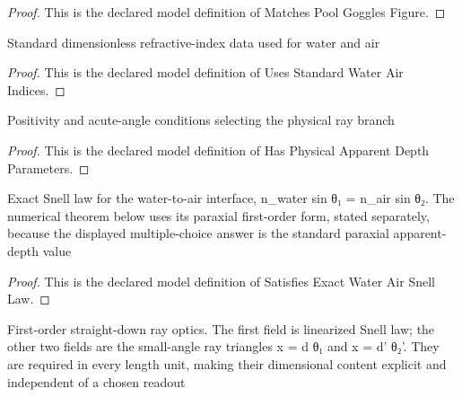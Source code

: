 \begin{proof}
  This is the declared model definition of Matches Pool Goggles Figure.
\end{proof}
\begin{definition}
  \label{def:physics:phyx-mini-0137:phyxminiproblems-problemphyxmini0137-usesstandardwaterairindices}
  Standard dimensionless refractive-index data used for water and air
\end{definition}
\begin{proof}
  This is the declared model definition of Uses Standard Water Air Indices.
\end{proof}
\begin{definition}
  \label{def:physics:phyx-mini-0137:phyxminiproblems-problemphyxmini0137-hasphysicalapparentdepthparameters}
  Positivity and acute-angle conditions selecting the physical ray branch
\end{definition}
\begin{proof}
  This is the declared model definition of Has Physical Apparent Depth Parameters.
\end{proof}
\begin{definition}
  \label{def:physics:phyx-mini-0137:phyxminiproblems-problemphyxmini0137-satisfiesexactwaterairsnelllaw}
  Exact Snell law for the water-to-air interface, n\_water sin θ₁ = n\_air sin θ₂. The numerical theorem below uses its paraxial first-order form, stated separately, because the displayed multiple-choice answer is the standard paraxial apparent-depth value
\end{definition}
\begin{proof}
  This is the declared model definition of Satisfies Exact Water Air Snell Law.
\end{proof}
\begin{definition}
  \label{def:physics:phyx-mini-0137:phyxminiproblems-problemphyxmini0137-satisfiesparaxialapparentdepthlaws}
  First-order straight-down ray optics. The first field is linearized Snell law; the other two fields are the small-angle ray triangles x = d θ₁ and x = d' θ₂'. They are required in every length unit, making their dimensional content explicit and independent of a chosen readout
\end{definition}
